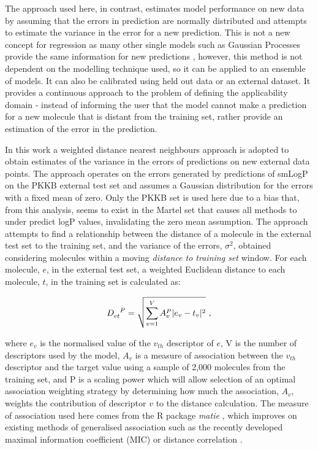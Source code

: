 \documentclass[10pt]{bmc_article}
\newenvironment{bmcformat}{\begin{raggedright}\baselineskip20pt\sloppy\setboolean{publ}{false}}{\end{raggedright}\baselineskip20pt\sloppy}
\begin{document}
\begin{bmcformat}
The approach used here, in contrast, estimates model performance on new data by assuming that the errors in prediction are normally distributed and attempts to estimate the variance in the error for a new prediction. This is not a new concept for regression as many other single models such as Gaussian Processes provide the same information for new predictions \cite{schwaighofer_accurate_2007}, however, this method is not dependent on the modelling technique used, so it can be applied to an ensemble of models. It can also be calibrated using held out data or an external dataset. It provides a continuous approach to the problem of defining the applicability domain - instead of informing the user that the model cannot make a prediction for a new molecule that is distant from the training set, rather provide an estimation of the error in the prediction.  

In this work a weighted distance nearest neighbours approach is adopted to obtain estimates of the variance in the errors of predictions on new external data points. The approach operates on the errors generated by predictions of smLogP on the PKKB external test set and assumes a Gaussian distribution for the errors with a fixed mean of zero. Only the PKKB set is used here due to a bias that, from this analysis, seems to exist in the Martel set that causes all methods to under predict logP values, invalidating the zero mean assumption. The approach attempts to find a relationship between the distance of a molecule in the external test set to the training set, and the variance of the errors, $\sigma^2$, obtained considering molecules within a moving \textit{distance to training set} window. For each molecule, $e$, in the external test set, a weighted Euclidean distance to each molecule, $t$, in the training set is calculated as: 

\begin{equation}
\tensor{D}{_e_t^P} = \sqrt{ \sum_{v=1}^{V}{A_v^P |e_v -  t_v|^2}}\ ,
\end{equation}


where $e_v$ is the normalised value of the $v_{th}$ descriptor of $e$, V is the number of descriptors used by the model, $A_v$ is a measure of association between the $v_{th}$ descriptor and the target value using a sample of 2,000 molecules from the training set, and P is a scaling power which will allow selection of an optimal association weighting strategy by determining how much the association, $A_v$, weights the contribution of descriptor $v$ to the distance calculation. The measure of association used here comes from the R package \textit{matie} \cite{murrell_discovering_2013}, which improves on existing methods of generalised association such as the recently developed maximal information coefficient (MIC) \cite{reshef_detecting_2011} or distance correlation \cite{szekely_measuring_2007}.


\end{bmcformat}
\end{document}
